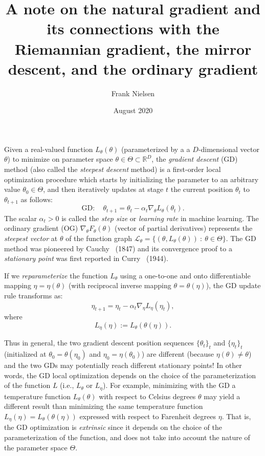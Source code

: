 \documentclass[11pt]{article}
\def\calL{\mathcal{L}}
\def\bbR{\mathbb{R}}
\begin{document}
\title{A note on the natural gradient and its connections with the Riemannian gradient, the mirror descent, and the ordinary gradient}

\author{Frank Nielsen}

\date{August 2020}

\maketitle

Given a real-valued function $L_\theta(\theta)$ (parameterized by a a $D$-dimensional vector $\theta$) to minimize on parameter space 
$\theta\in\Theta\subset\bbR^D$, 
the {\em gradient descent} (GD) method (also called the {\em steepest descent} method) is a first-order local optimization procedure which starts by initializing the parameter to an arbitrary value $\theta_0\in\Theta$, and then iteratively updates at stage $t$  
the current position $\theta_t$  to $\theta_{t+1}$ as follows:
\begin{equation}\label{eq:gd}
\mathrm{GD}:\quad \theta_{t+1} = \theta_t - \alpha_t \nabla_\theta L_\theta(\theta_t).
\end{equation}
The scalar $\alpha_t>0$ is called the {\em step size} or {\em learning rate} in machine learning.
The ordinary gradient (OG) $\nabla_\theta F_\theta(\theta)$ (vector of partial derivatives) represents the {\em steepest vector} at $\theta$ of the function graph $\calL_\theta=\{(\theta,L_\theta(\theta))\ :\ \theta\in\Theta\}$.
The GD method was pioneered by Cauchy~\cite{Cauchy-1847} (1847) and its convergence proof to a {\em stationary point} was first reported in Curry~\cite{Curry-1944} (1944).

If we {\em reparameterize} the function $L_\theta$ using a one-to-one and onto differentiable mapping $\eta=\eta(\theta)$ (with reciprocal inverse mapping $\theta=\theta(\eta)$), the GD update rule transforms as:
\begin{equation}
\eta_{t+1} = \eta_t-\alpha_t \nabla_\eta L_\eta(\eta_t),
\end{equation}
where 
\begin{equation}
L_\eta(\eta):=L_\theta(\theta(\eta)).
\end{equation}

Thus in general, the two gradient descent position sequences $\{\theta_t\}_t$ and $\{\eta_t\}_t$ (initialized at $\theta_0=\theta(\eta_0)$ and $\eta_0=\eta(\theta_0)$) are  different (because $\eta(\theta)\not=\theta$) and the two GDs may potentially reach different stationary points!
In other words, the GD local optimization depends on the choice of the parameterization of the function $L$ (i.e., $L_\theta$ or $L_\eta$).
For example,
 minimizing with the GD a temperature function $L_\theta(\theta)$ with respect to Celsius degrees $\theta$ may yield a different result 
than minimizing the same temperature function $L_\eta(\eta)=L_\theta(\theta(\eta))$ expressed with respect to Farenheit degrees $\eta$.
That is, the GD optimization is {\em extrinsic} since it depends on the choice of the parameterization of the function, and does not take into account the nature of the parameter space $\Theta$.
\end{document}
